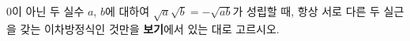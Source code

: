 $0$이 아닌 두 실수 $a$, $b$에 대하여 $\sqrt{a}\sqrt{b}=-\sqrt{ab}$가 성립할 때, 항상 서로 다른 두 실근을 갖는 이차방정식인 것만을 \textbf{보기}에서 있는 대로 고르시오.
